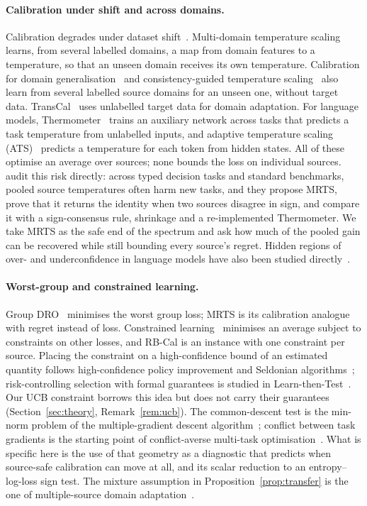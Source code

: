 \documentclass[11pt]{article}
\theoremstyle{remark}
\begin{document}
\paragraph{Calibration under shift and across domains.}
Calibration degrades under dataset shift~\citep{ovadia2019trust}.
Multi-domain temperature scaling~\citep{yu2022multidomain} learns, from several labelled domains, a map from domain features to a temperature, so that an unseen domain receives its own temperature.
Calibration for domain generalisation~\citep{gong2021dgcal} and consistency-guided temperature scaling~\citep{choi2024cts} also learn from several labelled source domains for an unseen one, without target data.
TransCal~\citep{wang2020transcal} uses unlabelled target data for domain adaptation.
For language models, Thermometer~\citep{shen2024thermometer} trains an auxiliary network across tasks that predicts a task temperature from unlabelled inputs, and adaptive temperature scaling (ATS)~\citep{xie2024ats} predicts a temperature for each token from hidden states.
All of these optimise an average over sources; none bounds the loss on individual sources.
\citet{calport2026} audit this risk directly: across typed decision tasks and standard benchmarks, pooled source temperatures often harm new tasks, and they propose MRTS, prove that it returns the identity when two sources disagree in sign, and compare it with a sign-consensus rule, shrinkage and a re-implemented Thermometer.
We take MRTS as the safe end of the spectrum and ask how much of the pooled gain can be recovered while still bounding every source's regret.
Hidden regions of over- and underconfidence in language models have also been studied directly~\citep{kobalczyk2026hidden}.

\paragraph{Worst-group and constrained learning.}
Group DRO~\citep{sagawa2020dro} minimises the worst group loss; MRTS is its calibration analogue with regret instead of loss.
Constrained learning~\citep{chamon2020pac} minimises an average subject to constraints on other losses, and RB-Cal is an instance with one constraint per source.
Placing the constraint on a high-confidence bound of an estimated quantity follows high-confidence policy improvement and Seldonian algorithms~\citep{thomas2015hcpi,thomas2019seldonian}; risk-controlling selection with formal guarantees is studied in Learn-then-Test~\citep{angelopoulos2021ltt}.
Our UCB constraint borrows this idea but does not carry their guarantees (Section~\ref{sec:theory}, Remark~\ref{rem:ucb}).
The common-descent test is the min-norm problem of the multiple-gradient descent algorithm~\citep{desideri2012mgda,sener2018mtl}; conflict between task gradients is the starting point of conflict-averse multi-task optimisation~\citep{liu2021cagrad}.
What is specific here is the use of that geometry as a diagnostic that predicts when source-safe calibration can move at all, and its scalar reduction to an entropy--log-loss sign test.
The mixture assumption in Proposition~\ref{prop:transfer} is the one of multiple-source domain adaptation~\citep{mansour2009multiple}.
\end{document}
